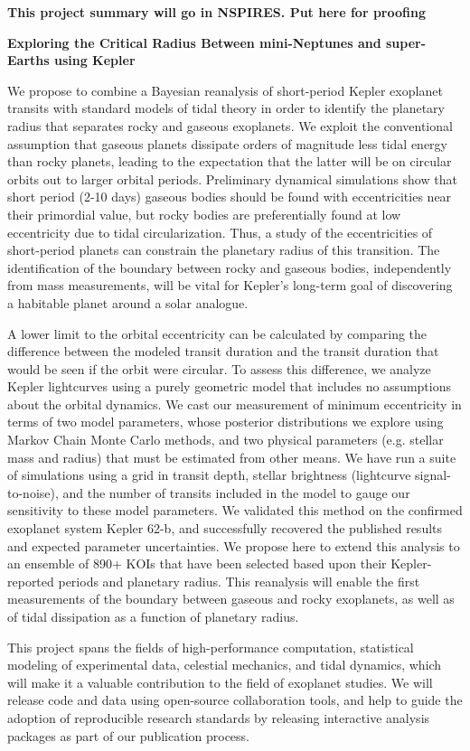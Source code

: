 \centerline{\bf This project summary will go in NSPIRES.  Put here for proofing} \medskip

\centerline{\bf Exploring the Critical Radius Between mini-Neptunes and super-Earths using Kepler} \medskip

We propose to combine a Bayesian reanalysis of short-period Kepler exoplanet transits with standard models of tidal theory in order to identify the planetary radius that separates rocky and gaseous exoplanets. We exploit the conventional assumption that gaseous planets dissipate orders of magnitude less tidal energy than rocky planets, leading to the expectation that the latter will be on circular orbits out to larger orbital periods. Preliminary dynamical simulations show that short period (2-10 days) gaseous bodies should be found with eccentricities near their primordial value, but rocky bodies are preferentially found at low eccentricity due to tidal circularization.  Thus, a study of the eccentricities of short-period planets can constrain the planetary radius of this transition.  The identification of the boundary between rocky and gaseous bodies, independently from mass measurements, will be vital for Kepler's long-term goal of discovering a habitable planet around a solar analogue.

A lower limit to the orbital eccentricity can be calculated by comparing the difference between the modeled transit duration and the transit duration that would be seen if the orbit were circular.  To assess this difference, we analyze Kepler lightcurves using a purely geometric model that includes no assumptions about the orbital dynamics.  We cast our measurement of minimum eccentricity in terms of two model parameters, whose posterior distributions we explore using Markov Chain Monte Carlo methods, and two physical parameters (e.g. stellar mass and radius) that must be estimated from other means.  We have run a suite of simulations using a grid in transit depth, stellar brightness (lightcurve signal-to-noise), and the number of transits included in the model to gauge our sensitivity to these model parameters.  We validated this method on the confirmed exoplanet system Kepler 62-b, and successfully recovered the published results and expected parameter uncertainties. We propose here to extend this analysis to an ensemble of 890+ KOIs that have been selected based upon their Kepler-reported periods and planetary radius.  This reanalysis will enable the first measurements of the boundary between gaseous and rocky exoplanets, as well as of tidal dissipation as a function of planetary radius.

This project spans the fields of high-performance computation, statistical modeling of experimental data, celestial mechanics, and tidal dynamics, which will make it a valuable contribution to the field of exoplanet studies.  We will release code and data using open-source collaboration tools, and help to guide the adoption of reproducible research standards by releasing interactive analysis packages as part of our publication process.


